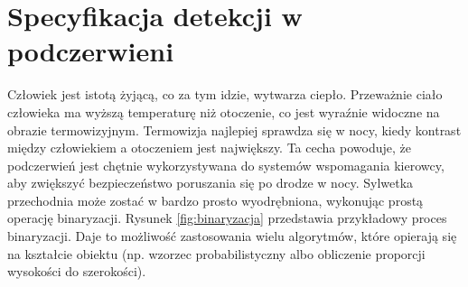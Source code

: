 \section{Specyfikacja detekcji w podczerwieni}

Człowiek jest istotą żyjącą, co za tym idzie, wytwarza ciepło. Przeważnie ciało człowieka ma wyższą temperaturę niż otoczenie, co jest wyraźnie widoczne na obrazie termowizyjnym. Termowizja najlepiej sprawdza się w nocy, kiedy kontrast między człowiekiem a otoczeniem jest największy. Ta cecha powoduje, że podczerwień jest chętnie wykorzystywana do systemów wspomagania kierowcy, aby zwiększyć bezpieczeństwo poruszania się po drodze w nocy.  Sylwetka przechodnia może zostać w bardzo prosto wyodrębniona, wykonując prostą operację binaryzacji. Rysunek \ref{fig:binaryzacja} przedstawia przykładowy proces binaryzacji. Daje to możliwość zastosowania wielu algorytmów, które opierają się na kształcie obiektu (np. wzorzec probabilistyczny albo obliczenie proporcji wysokości do szerokości).

